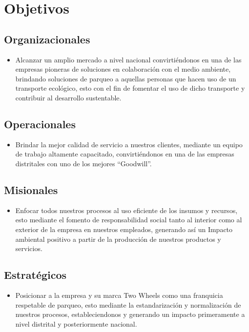 \section{Objetivos}
\subsection{Organizacionales}
\begin{itemize}
	\item Alcanzar un amplio mercado a nivel nacional convirtiéndonos en una de las empresas pioneras de soluciones en colaboración con el medio ambiente, brindando soluciones de parqueo a aquellas personas que hacen uso de un transporte ecológico, esto con el fin de fomentar el uso de dicho transporte y contribuir al desarrollo sustentable.
\end{itemize}

\subsection{Operacionales}
\begin{itemize}
	\item Brindar la mejor calidad de servicio a nuestros clientes, mediante un equipo de trabajo altamente capacitado, convirtiéndonos en una de las empresas distritales con uno de los mejores “Goodwill”.
\end{itemize}

\subsection{Misionales}
\begin{itemize}
	\item Enfocar todos nuestros procesos al uso eficiente de los insumos y recursos, esto mediante el fomento de responsabilidad social tanto al interior como al exterior de la empresa en nuestros empleados, generando así un Impacto ambiental positivo a partir de la producción de nuestros productos y servicios.
\end{itemize}

\subsection{Estratégicos}
\begin{itemize}
	\item Posicionar a la empresa y su marca Two Wheels como una franquicia respetable de parqueo, esto mediante la estandarización y normalización de nuestros procesos, estableciendonos y generando un impacto primeramente a nivel distrital y posteriormente nacional.
\end{itemize}

